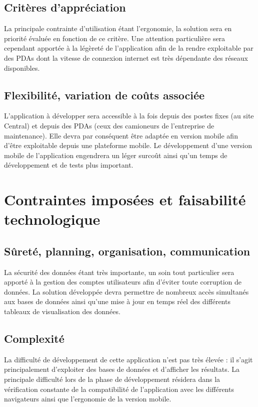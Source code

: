 \subsection{Critères d'appréciation}
La principale contrainte d'utilisation étant l'ergonomie, la solution sera en priorité évaluée en fonction de ce critère. Une attention particulière sera cependant apportée à la légèreté de l'application afin de la rendre exploitable par des PDAs dont la vitesse de connexion internet est très dépendante des réseaux disponibles.

\subsection{Flexibilité, variation de coûts associée}
L'application à développer sera accessible à la fois depuis des postes fixes (au site Central) et depuis des PDAs (ceux des camioneurs de l'entreprise de maintenance). Elle devra par conséquent être adaptée en version mobile afin d'être exploitable depuis une plateforme mobile. Le développement d'une version mobile de l'application engendrera un léger surcoût ainsi qu'un temps de développement et de tests plus important.

\section{Contraintes imposées et faisabilité technologique}
\subsection{Sûreté, planning, organisation, communication}
La sécurité des données étant très importante, un soin tout particulier sera apporté à la gestion des comptes utilisateurs afin d'éviter toute corruption de données. La solution développée devra permettre de nombreux accès simultanés aux bases de données ainsi qu'une mise à jour en temps réel des différents tableaux de visualisation des données.

\subsection{Complexité}
La difficulté de développement de cette application n'est pas très élevée : il s'agit principalement d'exploiter des bases de données et d'afficher les résultats.
La principale difficulté lors de la phase de développement résidera dans la vérification constante de la compatibilité de l'application avec les différents navigateurs ainsi que l'ergonomie de la version mobile.

